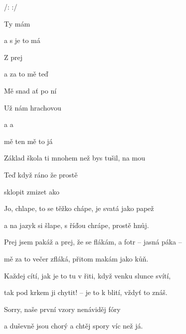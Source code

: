 

/:   :/ 

\zs
Ty   
mám   

a s  
je to  má    

Z   
prej   

a  za to 
mě teď     
\ks

\zs

Mě snad   
ať  po ní  

Už  nám 
hrachovou    

  a 
a  

mě  
ten mě  to já     

\ks

\zr
Základ škola ti 
mnohem  než bys tušil, na mou 

Teď  když ráno 
že prostě  

sklopit  zmizet  ako
\kr

\zs
Jo, chlape, to se těžko chápe, je svatá jako papež 

a na jazyk si šlape, s říďou chrápe, prostě hnůj.

Prej jsem pakáž a prej, že se flákám, a fotr -- jasná páka --

mě za to večer zfláká, přitom makám jako kůň.

\ks

\zs

Každej cítí, jak je to tu v řiti, když venku slunce svítí,

tak pod krkem ji chytit! -- je to k blití, vždyť to znáš.

Sorry, naše první vzory nenáviděj fóry 

a duševně jsou chorý a chtěj spory víc než já.
\ks

